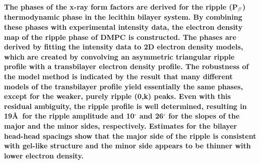 
\footnotesize{
\hspace{0.2in}
\textbf{
The phases of the x-ray form factors are derived for the ripple (P$_{\beta '}$)
thermodynamic phase in the lecithin bilayer system. By combining these phases 
with experimental intensity data, the electron density map of the 
ripple phase of DMPC is constructed. The phases are derived by fitting 
the intensity data to 2D electron density models, which are created
by convolving an asymmetric triangular ripple profile with a transbilayer 
electron density profile.  The robustness of the model method
is indicated by the result that many different models of the
transbilayer profile yield essentially the same phases, except
for the weaker, purely ripple (0,k) peaks.  Even with this
residual ambiguity, the ripple profile is well determined, resulting in
19\AA\ for the ripple amplitude and 10$^{\circ}$ and 26$^{\circ}$ 
for the slopes of the major and the minor sides,
respectively.   Estimates for the bilayer head-head spacings
show that the major side of the ripple is consistent with gel-like structure
and the minor side appears to be thinner with lower electron density.
}
}
\normalsize

